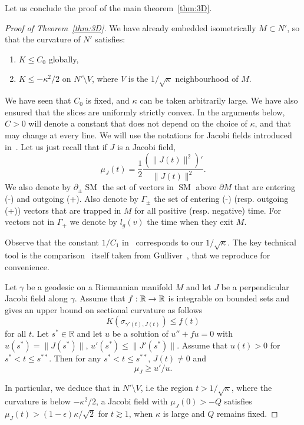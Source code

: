 \documentclass[AHL,Unicode,longabstracts,published]{cedram}
\newcommand{\R}{\mathbb{R}}
\DeclareMathOperator{\SM}{SM}
\theoremstyle{plain}
\renewcommand*{\to}{\mathchoice{\longrightarrow}{\rightarrow}{\rightarrow}{\rightarrow}}
\begin{document}
Let us conclude the proof of the main theorem~\ref{thm:3D}.
\begin{proof}[Proof of Theorem~\ref{thm:3D}]
We have already embedded isometrically $M\subset N'$, so that the curvature of $N'$ satisfies:
\begin{enumerate}
\item $K \leq C_0$ globally,
\item $K \leq - \kappa^2 /2$ on $N'\setminus V$, where $V$ is the $1/\sqrt{\kappa}$ neighbourhood of $M$.
\end{enumerate}
We have seen that $C_0$ is fixed, and $\kappa$ can be taken arbitrarily large. We have also ensured that the slices are uniformly strictly convex. In the arguments below, $C>0$ will denote a constant that does not depend on the choice of $\kappa$, and that may change at every line. We will use the notations for Jacobi fields introduced in~\cite{Chen-Erchenko-Gogolev}. Let us just recall that if $J$ is a Jacobi field,
\[
\mu_J(t) = \frac{1}{2}\frac{(\| J(t) \|^2)'}{\|J(t)\|^2}.
\]
We also denote by $\partial_{\pm} \SM$ the set of vectors in $\SM$ above $\partial M$ that are entering (-) and outgoing (+). Also denote by $\Gamma_{\pm}$ the set of entering (-) (resp. outgoing (+)) vectors that are trapped in $M$ for all positive (resp. negative) time. For vectors not in $\Gamma_+$ we denote by $l_g(v)$ the time when they exit $M$.

Observe that the constant $1/C_1$ in~\cite{Chen-Erchenko-Gogolev} corresponds to our $1/\sqrt{\kappa}$. The key technical tool is the comparison~\cite[Lemma~2.8]{Chen-Erchenko-Gogolev} itself taken from Gulliver~\cite[Lemma~3]{Gulliver-75}, that we reproduce for convenience.

\begin{lemm}
Let $\gamma$ be a geodesic on a Riemannian manifold $M$ and let $J$ be a perpendicular Jacobi field along $\gamma$. Assume that $f:\R\to\R$ is integrable on bounded sets and gives an upper bound on sectional curvature as follows
\[
K\left(\sigma_{\gamma'(t), J(t)}\right) \leq f (t)
\]
for all $t$. Let $s^\ast\in\R$ and let $u$ be a solution of $u''+f u = 0$ with $u(s^\ast)= \|J(s^\ast)\|$, $u'(s^\ast)\leq \|J'(s^\ast)\|$. Assume that $u(t)>0$ for $s^\ast < t \leq s^{\ast\ast}$. Then for any $s^\ast < t \leq s^{\ast\ast}$, $J(t)\neq 0$ and
\[
\mu_J \geq u' / u.
\]
\end{lemm}

In particular, we deduce that in $N'\setminus V$, i.e the region $t>1/\sqrt{\kappa}$, where the curvature is below $-\kappa^2/2$, a Jacobi field with $\mu_J(0)> - Q$ satisfies $\mu_J(t)>(1-\epsilon)\kappa/\sqrt{2}$ for $t\gtrsim 1$, when $\kappa$ is large and $Q$ remains fixed.


\end{proof}
\end{document}
